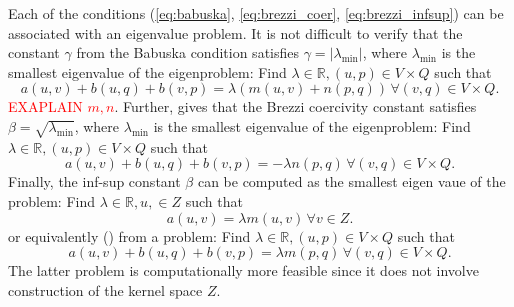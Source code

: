 \documentclass[a4paper,10pt]{article}
\newcommand{\R}{\ensuremath{\mathbb{R}}}
\newcommand{\TODO}[1]{\textcolor{red}{\MakeUppercase{#1}}}
\begin{document}
  Each of the conditions (\ref{eq:babuska}, \ref{eq:brezzi_coer},
  \ref{eq:brezzi_infsup}) can be associated with
  an eigenvalue problem. It is not difficult to verify that the constant $\gamma$
  from the Babuska condition satisfies $\gamma=\left|\lambda_{\text{min}}\right|$, where
  $\lambda_\text{min}$ is the smallest eigenvalue of the eigenproblem: Find
  $\lambda\in\R, (u, p) \in V\times Q$ such that
  \begin{equation}
    a(u, v) + b(u, q) + b(v, p) = \lambda\left(m(u, v) + n(p, q)\right)\,\forall
    (v, q) \in V\times Q.
  \end{equation}
  \TODO{exaplain $m, n$}. Further, \cite{qin} gives that the Brezzi coercivity
  constant satisfies $\beta=\sqrt{\lambda_{\text{min}}}$, where 
  $\lambda_\text{min}$ is the smallest eigenvalue of the eigenproblem: Find
  $\lambda\in\R, (u, p) \in V\times Q$ such that
  \begin{equation}
    a(u, v) + b(u, q) + b(v, p) = -\lambda n(p, q)\,\forall(v, q) \in V\times Q.
  \end{equation}
  Finally, the inf-sup constant $\beta$ can be computed as the smallest eigen
  vaue of the problem: Find $\lambda\in\R, u, \in Z$ such that
  \begin{equation}
    a(u, v) = \lambda m(u, v)\,\forall v \in Z.
  \end{equation}
  or equivalently (\cite{rognes}) from a problem: Find
  $\lambda\in\R, (u, p) \in V\times Q$ such that
  \begin{equation}
    a(u, v) + b(u, q) + b(v, p) = \lambda m(p, q)\,\forall(v, q) \in V\times Q.
  \end{equation}
  The latter problem is computationally more feasible since it does not involve
  construction of the kernel space $Z$.
\end{document}
